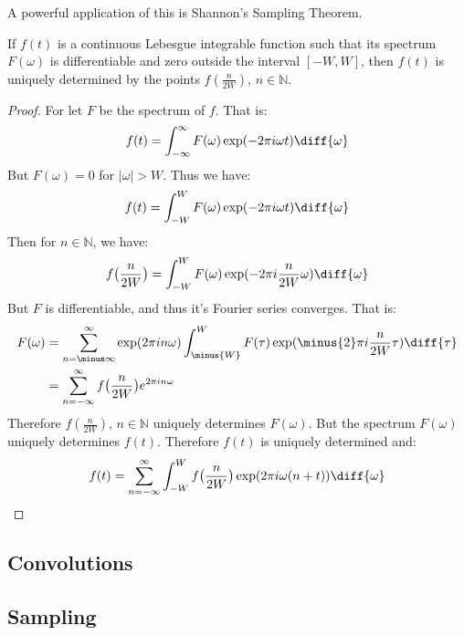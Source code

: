         A powerful application of this is
        Shannon's Sampling Theorem.
        \begin{theorem}
            If $f(t)$ is a continuous
            Lebesgue integrable function such that
            its spectrum $F(\omega)$ is differentiable and zero
            outside the interval $[-W,W]$,
            then $f(t)$ is uniquely determined
            by the points $f(\frac{n}{2W})$, $n\in\mathbb{N}$.
        \end{theorem}
        \begin{proof}
            For let $F$ be the spectrum of $f$. That is:
            \begin{equation}
                f(t)=\int_{-\infty}^{\infty}F(\omega)
                \exp(-2\pi{i}\omega{t})\diff{\omega}
            \end{equation}
            But $F(\omega)=0$ for $|\omega|>W$. Thus we have:
            \begin{equation}
                f(t)=\int_{-W}^{W}F(\omega)
                \exp(-2\pi{i}\omega{t})\diff{\omega}
            \end{equation}
            Then for $n\in\mathbb{N}$, we have:
            \begin{equation}
                f\big(\frac{n}{2W}\big)=\int_{-W}^{W}F(\omega)
                \exp(-2\pi{i}\frac{n}{2W}\omega)\diff{\omega}
            \end{equation}
            But $F$ is differentiable, and thus it's Fourier
            series converges. That is:
            \begin{subequations}
                \begin{align}
                    F(\omega)
                    &=\sum_{n=\minus\infty}^{\infty}
                        \exp(2\pi{i}n\omega)
                    \int_{\minus{W}}^{W}F(\tau)
                    \exp(\minus{2}\pi{i}\frac{n}{2W}\tau)
                        \diff{\tau}\\
                    &=\sum_{n=-\infty}^{\infty}f
                      \big(\frac{n}{2W}\big)e^{2\pi{i}n\omega}
                \end{align}
            \end{subequations}
            Therefore $f(\frac{n}{2W})$, $n\in \mathbb{N}$
            uniquely determines $F(\omega)$. But the
            spectrum $F(\omega)$ uniquely determines
            $f(t)$. Therefore $f(t)$ is
            uniquely determined and:
            \begin{equation}
                f(t)=\sum_{n=-\infty}^{\infty}\int_{-W}^{W}
                f\big(\frac{n}{2W}\big)
                \exp(2\pi{i}\omega(n+t))\diff{\omega}
            \end{equation}
        \end{proof}
    \subsection{Convolutions}
    \subsection{Sampling}